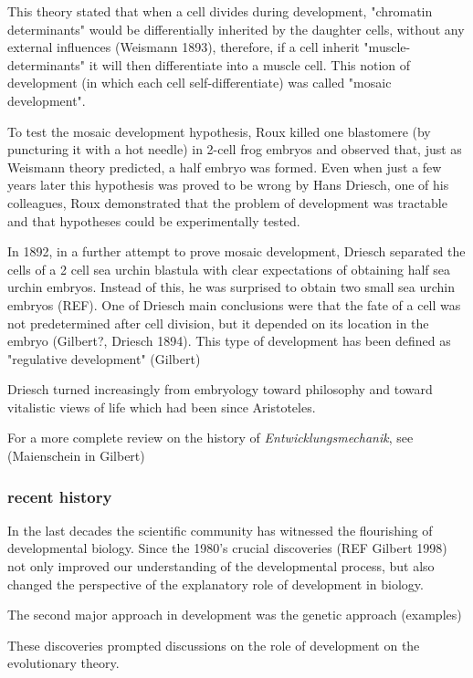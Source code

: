 This theory stated that when a cell divides during development, "chromatin determinants" would be differentially inherited by the daughter cells, without any external influences (Weismann 1893), therefore, if a cell inherit "muscle-determinants" it will then differentiate into a muscle cell.
This notion of development (in which each cell self-differentiate) was called "mosaic development".


To test the mosaic development hypothesis, Roux killed one blastomere (by puncturing it with a hot needle) in 2-cell frog embryos and observed that, just as Weismann theory predicted, a half embryo was formed. Even when just a few years later this hypothesis was proved to be wrong by Hans Driesch, one of his colleagues, Roux demonstrated that the problem of development was tractable and that hypotheses could be experimentally tested.

In 1892, in a further attempt to prove mosaic development, Driesch separated the cells of a 2 cell sea urchin blastula with clear expectations of obtaining half sea urchin embryos. 
Instead of this, he was surprised to obtain two small sea urchin embryos (REF). One of Driesch main conclusions were that the fate of a cell was not predetermined after cell division, but it depended on its location in the embryo (Gilbert?, Driesch 1894). This type of development has been defined as "regulative development" (Gilbert)

Driesch turned increasingly from embryology toward philosophy and toward
vitalistic views of life which had been since Aristoteles.

For a more complete review on the history of \textit{Entwicklungsmechanik}, see (Maienschein in Gilbert)

\subsubsection{recent history}

In the last decades the scientific community has witnessed the flourishing of developmental biology.
Since the 1980's crucial discoveries (REF Gilbert 1998) not only improved our understanding of the developmental process, but also changed the perspective of the explanatory role of development in biology.


The second major approach in development was the genetic approach (examples)

These discoveries prompted discussions on the role of development on the evolutionary theory.

